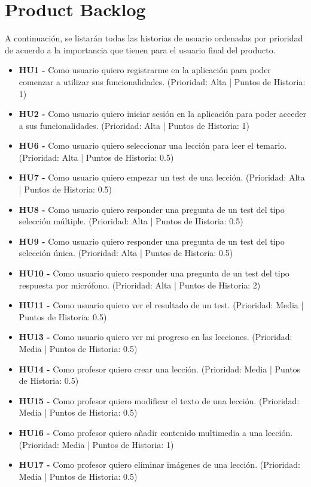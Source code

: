 \section{Product Backlog}
A continuación, se listarán todas las historias de usuario ordenadas por prioridad de acuerdo a la importancia que tienen para el usuario final del producto.
\begin{itemize}
    \item \textbf{HU1 - } Como usuario quiero registrarme en la aplicación para poder comenzar a utilizar sus funcionalidades. (Prioridad: Alta | Puntos de Historia: 1)
    \item \textbf{HU2 - } Como usuario quiero iniciar sesión en la aplicación para poder acceder a sus funcionalidades. (Prioridad: Alta | Puntos de Historia: 1)
    \item \textbf{HU6 - } Como usuario quiero seleccionar una lección para leer el temario. (Prioridad: Alta | Puntos de Historia: 0.5)
    \item \textbf{HU7 - } Como usuario quiero empezar un test de una lección. (Prioridad: Alta | Puntos de Historia: 0.5)
    \item \textbf{HU8 - } Como usuario quiero responder una pregunta de un test del tipo selección múltiple. (Prioridad: Alta | Puntos de Historia: 0.5)
    \item \textbf{HU9 - } Como usuario quiero responder una pregunta de un test del tipo selección única. (Prioridad: Alta | Puntos de Historia: 0.5)
    \item \textbf{HU10 - } Como usuario quiero responder una pregunta de un test del tipo respuesta por micrófono. (Prioridad: Alta | Puntos de Historia: 2)
    \item \textbf{HU11 - } Como usuario quiero ver el resultado de un test. (Prioridad: Media | Puntos de Historia: 0.5)
    \item \textbf{HU13 - } Como usuario quiero ver mi progreso en las lecciones. (Prioridad: Media | Puntos de Historia: 0.5)
    \item \textbf{HU14 - } Como profesor quiero crear una lección. (Prioridad: Media | Puntos de Historia: 0.5)
    \item \textbf{HU15 - } Como profesor quiero modificar el texto de una lección. (Prioridad: Media | Puntos de Historia: 0.5)
    \item \textbf{HU16 - } Como profesor quiero añadir contenido multimedia a una lección. (Prioridad: Media | Puntos de Historia: 1)
    \item \textbf{HU17 - } Como profesor quiero eliminar imágenes de una lección. (Prioridad: Media | Puntos de Historia: 0.5)

\end{itemize}

